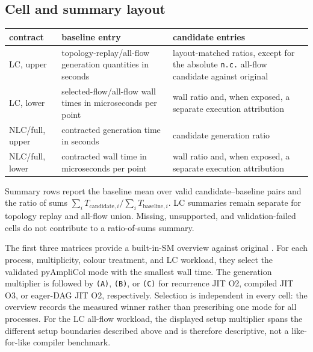 \subsection*{Cell and summary layout}

\begin{center}
\small
\begin{tabular}{@{}L{0.95in}L{2.45in}L{5.75in}@{}}
\toprule
\textbf{contract} & \textbf{baseline entry} & \textbf{candidate entries} \\
\midrule
LC, upper
  & topology-replay/all-flow generation quantities in seconds
  & layout-matched ratios, except for the absolute \texttt{n.c.} all-flow
    candidate against original \AC{} \\
LC, lower
  & selected-flow/all-flow wall times in microseconds per point
  & wall ratio and, when exposed, a separate execution attribution \\
NLC/full, upper
  & contracted generation time in seconds
  & candidate generation ratio \\
NLC/full, lower
  & contracted wall time in microseconds per point
  & wall ratio and, when exposed, a separate execution attribution \\
\bottomrule
\end{tabular}
\end{center}

Summary rows report the baseline mean over valid candidate--baseline pairs and
the ratio of sums
\(\sum_i T_{\mathrm{candidate},i}/\sum_i T_{\mathrm{baseline},i}\).
LC summaries remain separate for topology replay and all-flow union.  Missing,
unsupported, and validation-failed cells do not contribute to a ratio-of-sums
summary.

The first three matrices provide a built-in-SM overview against original
\AC{}.  For each process, multiplicity, colour treatment, and LC workload,
they select the validated pyAmpliCol mode with the smallest wall time.  The
generation multiplier is followed by \texttt{(A)}, \texttt{(B)}, or
\texttt{(C)} for recurrence JIT O2, compiled JIT O3, or eager-DAG JIT O2,
respectively.  Selection is independent in every cell: the overview records
the measured winner rather than prescribing one mode for all processes.
For the LC all-flow workload, the displayed setup multiplier spans the
different setup boundaries described above and is therefore descriptive, not
a like-for-like compiler benchmark.





